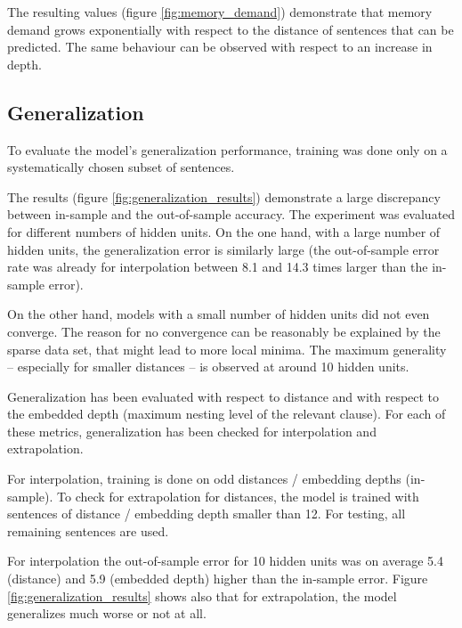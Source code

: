 \documentclass[11pt,a4paper]{article}
\begin{document}
The resulting values (figure \ref{fig:memory_demand}) demonstrate that memory demand grows exponentially with respect to the distance of sentences that can be predicted. The same behaviour can be observed with respect to an increase in depth. 

\subsection{Generalization}
\label{subsec:generalization}

To evaluate the model's generalization performance, training was done only on a systematically chosen subset of sentences.

The results (figure \ref{fig:generalization_results}) demonstrate a large discrepancy between in-sample and the out-of-sample accuracy. The experiment was evaluated for different numbers of hidden units. On the one hand, with a large number of hidden units, the generalization error is similarly large (the out-of-sample error rate was already for interpolation between 8.1 and 14.3 times larger than the in-sample error).

On the other hand, models with a small number of hidden units did not even converge. The reason for no convergence can be reasonably be explained by the sparse data set, that might lead to more local minima. The maximum generality -- especially for smaller distances -- is observed at around 10 hidden units.

Generalization has been evaluated with respect to distance and with respect to the embedded depth (maximum nesting level of the relevant clause). For each of these metrics, generalization has been checked for interpolation and extrapolation.

For interpolation, training is done on odd distances / embedding depths (in-sample). To check for extrapolation for distances, the model is trained with sentences of distance / embedding depth smaller than 12. For testing, all remaining sentences are used.

For interpolation the out-of-sample error for 10 hidden units was on average 5.4 (distance) and 5.9 (embedded depth) higher than the in-sample error. Figure \ref{fig:generalization_results} shows also that for extrapolation, the model generalizes much worse or not at all.
\end{document}
